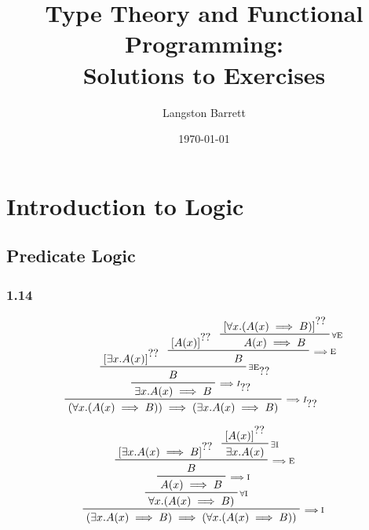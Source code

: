 \documentclass{book}
\begin{document}
\title{Type Theory and Functional Programming: \\ Solutions to Exercises}
\author{Langston Barrett}
\date{\today}
\maketitle

\chapter{Introduction to Logic}
\section{Predicate Logic}

\subsection*{1.14}
\begin{displaymath}
  \prftree[r]{$\scriptstyle\implies I_{\prfref<assum:root>}$}
    {\prftree[r]{$\scriptstyle\implies I_{\prfref<assum:existsx>}$}
      {\prftree[r]{$\scriptstyle\exists\mathrm{E}_{\prfref<assum:Ax>}$}
        {\prfboundedassumption<assum:existsx>{\exists x.A(x)}}
        {\prftree[r]{$\scriptstyle\implies\mathrm{E}$}
          {\prfboundedassumption<assum:Ax>{A(x)}}
          {\prftree[r]{$\scriptstyle\forall\mathrm{E}$}
            {\prfboundedassumption<assum:root>{\forall x.(A(x)\implies B)}}
            {A(x)\implies B}}
          {B}}
        {B}}
      {\exists x.A(x)\implies B}}
    {(\forall x.(A(x)\implies B))\implies (\exists x.A(x)\implies B)}
\end{displaymath}

\begin{displaymath}
  \prftree[r]{$\scriptstyle\implies\mathrm{I}_{}$}
    {\prftree[r]{$\scriptstyle\forall\mathrm{I}_{}$}
      {\prftree[r]{$\scriptstyle\implies\mathrm{I}$}
        {\prftree[r]{$\scriptstyle\implies\mathrm{E}$}
          {\prfboundedassumption<assum:impl>{\exists x.A(x)\implies B}}
          {\prftree[r]{$\scriptstyle\exists\mathrm{I}$}
            {\prfboundedassumption<assum:ax>{A(x)}}
            {\exists x.A(x)}}
          {B}}
        {A(x)\implies B}}
      {\forall x.(A(x)\implies B)}}
    {(\exists x.A(x)\implies B)\implies (\forall x.(A(x)\implies B))}
\end{displaymath}
\end{document}
